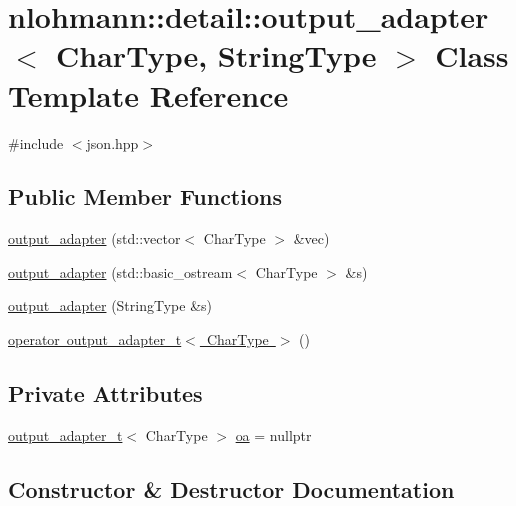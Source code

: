 \hypertarget{classnlohmann_1_1detail_1_1output__adapter}{}\section{nlohmann\+::detail\+::output\+\_\+adapter$<$ Char\+Type, String\+Type $>$ Class Template Reference}
\label{classnlohmann_1_1detail_1_1output__adapter}


{\ttfamily \#include $<$json.\+hpp$>$}

\subsection*{Public Member Functions}
\begin{DoxyCompactItemize}
\item 
\mbox{\hyperlink{classnlohmann_1_1detail_1_1output__adapter_a05a30a77b568fd84676078d938cbd484}{output\+\_\+adapter}} (std\+::vector$<$ Char\+Type $>$ \&vec)
\item 
\mbox{\hyperlink{classnlohmann_1_1detail_1_1output__adapter_a43b3ba852e6a2c3f4d312543bb04c00d}{output\+\_\+adapter}} (std\+::basic\+\_\+ostream$<$ Char\+Type $>$ \&s)
\item 
\mbox{\hyperlink{classnlohmann_1_1detail_1_1output__adapter_a6ad59d1ec534383b430cd7ef8a518539}{output\+\_\+adapter}} (String\+Type \&s)
\item 
\mbox{\hyperlink{classnlohmann_1_1detail_1_1output__adapter_a5fdac7aec8ade2f4bb0b5df30550d90c}{operator output\+\_\+adapter\+\_\+t$<$ Char\+Type $>$}} ()
\end{DoxyCompactItemize}
\subsection*{Private Attributes}
\begin{DoxyCompactItemize}
\item 
\mbox{\hyperlink{namespacenlohmann_1_1detail_a9b680ddfb58f27eb53a67229447fc556}{output\+\_\+adapter\+\_\+t}}$<$ Char\+Type $>$ \mbox{\hyperlink{classnlohmann_1_1detail_1_1output__adapter_a323c18d74d6680faafec6dc3ace825e2}{oa}} = nullptr
\end{DoxyCompactItemize}


\subsection{Constructor \& Destructor Documentation}
\mbox{\label{classnlohmann_1_1detail_1_1output__adapter_a05a30a77b568fd84676078d938cbd484}} 
